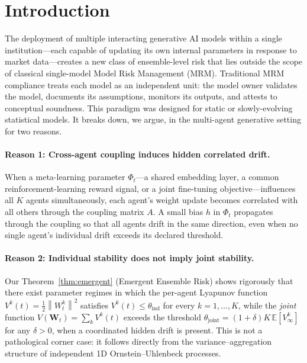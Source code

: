 \documentclass[12pt]{article}
\theoremstyle{plain}
\theoremstyle{definition}
\newcommand{\E}{\mathbb{E}}
\newcommand{\W}{\mathbf{W}}
\newcommand{\norm}[1]{\left\lVert #1 \right\rVert}
\begin{document}
\tableofcontents
\newpage

\section{Introduction}
\label{sec:intro}

The deployment of multiple interacting generative AI models within a
single institution---each capable of updating its own internal
parameters in response to market data---creates a new class of ensemble-level
risk that lies outside the scope of classical single-model Model Risk Management (MRM).
Traditional MRM compliance treats each model as an independent unit:
the model owner validates the model, documents its assumptions, monitors
its outputs, and attests to conceptual soundness.  This paradigm was
designed for static or slowly-evolving statistical models.  It breaks
down, we argue, in the multi-agent generative setting for two reasons.

\paragraph{Reason 1: Cross-agent coupling induces hidden correlated drift.}
When a meta-learning parameter $\Phi_t$---a shared embedding layer,
a common reinforcement-learning reward signal, or a joint fine-tuning
objective---influences all $K$ agents simultaneously, each agent's
weight update becomes correlated with all others through the coupling
matrix $A$.  A small bias $h$ in $\Phi_t$ propagates through the coupling
so that all agents drift in the same direction, even when no single
agent's individual drift exceeds its declared threshold.

\paragraph{Reason 2: Individual stability does not imply joint stability.}
Our Theorem~\ref{thm:emergent} (Emergent Ensemble Risk) shows rigorously
that there exist parameter regimes in which the per-agent Lyapunov
function $V^k(t) = \tfrac{1}{2}\norm{W^k_t}^2$ satisfies
$V^k(t) \leq \theta_{\mathrm{ind}}$ for every $k = 1,\ldots,K$, while
the \emph{joint} function $V(\W_t) = \sum_k V^k(t)$ exceeds the
threshold $\theta_{\mathrm{joint}} = (1+\delta)K\,\E[V^k_\infty]$ for
any $\delta > 0$, when a coordinated hidden drift is present.  This
is not a pathological corner case: it follows directly from the
variance--aggregation structure of independent 1D Ornstein--Uhlenbeck
processes.
\end{document}
